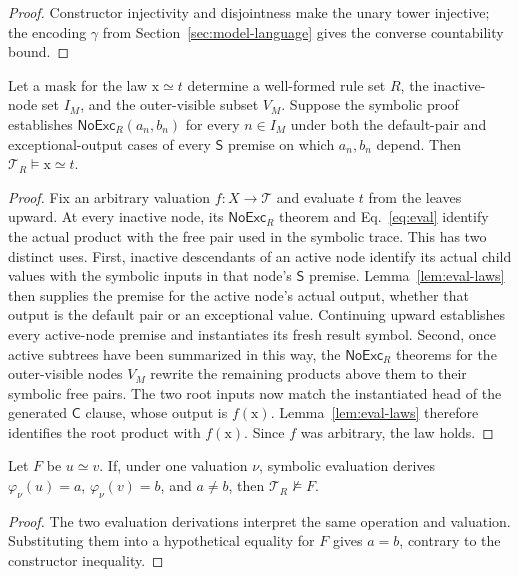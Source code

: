 \documentclass[runningheads]{llncs}
\newcommand{\Tree}{\mathcal{T}}
\newcommand{\Code}{\mathsf{C}}
\newcommand{\Step}{\mathsf{S}}
\newcommand{\NoExc}{\mathsf{NoExc}}
\begin{document}
\begin{proof}
Constructor injectivity and disjointness make the unary tower injective; the
encoding $\gamma$ from Section~\ref{sec:model-language} gives the converse
countability bound.
\end{proof}

\begin{lemma}
\label{lem:tableau}
Let a mask for the law $\mathrm{x}\simeq t$ determine a well-formed rule set
$R$, the inactive-node set $I_M$, and the outer-visible subset $V_M$.  Suppose
the symbolic proof establishes $\NoExc_R(a_n,b_n)$ for every $n\in I_M$ under
both the default-pair and exceptional-output cases of every $\Step$ premise on
which $a_n,b_n$ depend.  Then
$\mathcal T_R\models\mathrm{x}\simeq t$.
\end{lemma}

\begin{proof}
Fix an arbitrary valuation $f:X\to\Tree$ and evaluate $t$ from the leaves
upward.  At every inactive node, its $\NoExc_R$ theorem and
Eq.~\eqref{eq:eval} identify the actual product with the free pair used in the
symbolic trace.  This has two distinct uses.  First, inactive descendants of
an active node identify its actual child values with the symbolic inputs in
that node's $\Step$ premise.  Lemma~\ref{lem:eval-laws} then supplies the
premise for the active node's actual output, whether that output is the default
pair or an exceptional value.  Continuing upward establishes every active-node
premise and instantiates its fresh result symbol.  Second, once active subtrees
have been summarized in this way, the $\NoExc_R$ theorems for the
outer-visible nodes $V_M$ rewrite the remaining products above them to their
symbolic free pairs.  The two root inputs now match the instantiated head of
the generated $\Code$ clause, whose output is $f(\mathrm{x})$.
Lemma~\ref{lem:eval-laws} therefore identifies the root product with
$f(\mathrm{x})$.  Since $f$ was arbitrary, the law holds.
\end{proof}

\begin{lemma}
\label{lem:countervaluation}
Let $F$ be $u\simeq v$.  If, under one valuation $\nu$, symbolic evaluation
derives $\varphi_\nu(u)=a$, $\varphi_\nu(v)=b$, and $a\ne b$, then
$\mathcal T_R\not\models F$.
\end{lemma}

\begin{proof}
The two evaluation derivations interpret the same operation and valuation.
Substituting them into a hypothetical equality for $F$ gives $a=b$, contrary
to the constructor inequality.
\end{proof}
\end{document}
